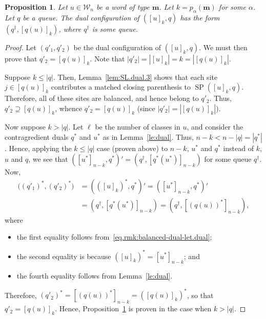 \documentclass[reqno]{amsart}
\newcommand{\0}{\phantom{c}}
\DeclareMathOperator{\SP}{SP} %
\newcommand{\mm}{\mathbf{m}}
\newcommand{\mcW}{\mathcal{W}}
\newcommand{\abs}[1]{\left| #1 \right|}
\newcommand{\tup}[1]{\left( #1 \right)}
\newcommand{\ive}[1]{\left[ #1 \right]}
\theoremstyle{plain}
\newtheorem{prop}[thm]{Proposition}
\theoremstyle{definition}
\numberwithin{equation}{section}
\begin{document}
\begin{prop} \label{prop:SL.dual}
Let $u \in \mcW_n$ be a word of type $\mm$.
Let $k = p_{\alpha}(\mm)$ for some $\alpha$.
Let $q$ be a queue.
The dual configuration of $\tup{ [u]_k , q }$ has the form $\tup{q^{\dagger} , [q(u)]_k }$, where $q^{\dagger}$ is some queue.
\end{prop}

\begin{proof}
Let $\tup{q'_1, q'_2}$ be the dual configuration of $\tup{ [u]_k , q }$.
We must then prove that $q'_2 = \ive{q(u)}_k$.
Note that $\abs{q'_2} = \abs{\ive{u}_k} = k = \abs{\ive{q(u)}_k}$.

Suppose $k \leq \abs{q}$.
Then, Lemma~\ref{lem:SL.dual.3} shows that each site $j \in \ive{q(u)}_k$ contributes a matched closing parenthesis to $\SP(\ive{u}_k, q)$.
Therefore, all of these sites are balanced, and hence belong to $q'_2$.
Thus, $q'_2 \supseteq \ive{q(u)}_k$, whence $q'_2 = \ive{q(u)}_k$
(since $\abs{q'_2} = \abs{\ive{q(u)}_k}$).

Now suppose $k > \abs{q}$.
Let $\ell$ be the number of classes in $u$, and consider the contragredient duals $q^*$ and $u^*$ as in Lemma~\ref{le:dual}.
Thus, $n-k < n - \abs{q} = \abs{q^*}$.
Hence, applying the $k \leq \abs{q}$ case (proven above)
to $n-k$, $u^*$ and $q^*$ instead of $k$, $u$ and $q$,
we see that
$\tup{ [u^*]_{n-k} , q^* }' = \tup{ q^\dagger , [q^*(u^*)]_{n-k} }$
for some queue $q^\dagger$.
Now,
\begin{align*}
 \bigl( (q'_1)^*, (q'_2)^* \bigr)
 &= \tup{ ([u]_k)^* , q^* }'
 = \tup{ [u^*]_{n-k} , q^* }' \\
 & = \tup{ q^\dagger , [q^*(u^*)]_{n-k} }
 = \tup{ q^\dagger , [(q(u))^*]_{n-k} } ,
\end{align*}
where
\begin{itemize}
 \item the first equality follows from~\eqref{eq.rmk:balanced-dual-let.dual};
 \item the second equality is because $([u]_k)^* = [u^*]_{n-k}$; and
 \item the fourth equality follows from Lemma~\ref{le:dual}.
\end{itemize}
Therefore, $(q'_2)^* = [(q(u))^*]_{n-k} = ([q(u)]_k)^*$, so that
$q'_2 = [q(u)]_k$.
Hence, Proposition~\ref{prop:SL.dual} is proven in the case when $k > \abs{q}$.
\end{proof}
\end{document}
